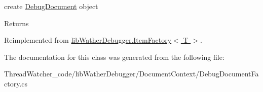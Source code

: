 create \hyperlink{classlib_wather_debugger_1_1_document_context_1_1_debug_document}{Debug\+Document} object 

\begin{DoxyReturn}{Returns}

\end{DoxyReturn}


Reimplemented from \hyperlink{classlib_wather_debugger_1_1_item_factory_3_01_t_01_4}{lib\+Wather\+Debugger.\+Item\+Factory$<$ T $>$}.



The documentation for this class was generated from the following file\+:\begin{DoxyCompactItemize}
\item 
Thread\+Watcher\+\_\+code/lib\+Wather\+Debugger/\+Document\+Context/Debug\+Document\+Factory.\+cs\end{DoxyCompactItemize}
